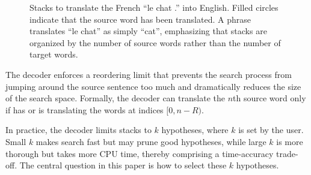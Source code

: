 \documentclass[11pt]{article}
\begin{document}
\begin{figure}\small%
\caption{\label{stacks}Stacks to translate the French ``le chat .'' into English.  Filled circles indicate that the source word has been translated.  A phrase translates ``le chat'' as simply ``cat'', emphasizing that stacks are organized by the number of source words rather than the number of target words.}
\end{figure}

The decoder enforces a reordering limit that prevents the search process from jumping around the source sentence too much and dramatically reduces the size of the search space.  Formally, the decoder can translate the $n$th source word only if has or is translating the words at indices $[0,n-R)$.  

In practice, the decoder limits stacks to $k$ hypotheses, where $k$ is set by the user.  Small $k$ makes search fast but may prune good hypotheses, while large $k$ is more thorough but takes more CPU time, thereby comprising a time-accuracy trade-off.  The central question in this paper is how to select these $k$ hypotheses. %
\end{document}
